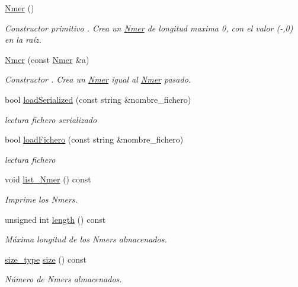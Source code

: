 \begin{DoxyCompactItemize}
\item 
\hyperlink{classNmer_ac2a651dd05b03e716b877c26386d772e}{Nmer} ()
\begin{DoxyCompactList}\small\item\em Constructor primitivo . Crea un \hyperlink{classNmer}{Nmer} de longitud maxima 0, con el valor (\textquotesingle{}-\/\textquotesingle{},0) en la raíz. \end{DoxyCompactList}\item 
\hyperlink{classNmer_aa15e62b748a55aec2f43f65497fc2a5e}{Nmer} (const \hyperlink{classNmer}{Nmer} \&a)
\begin{DoxyCompactList}\small\item\em Constructor . Crea un \hyperlink{classNmer}{Nmer} igual al \hyperlink{classNmer}{Nmer} pasado. \end{DoxyCompactList}\item 
bool \hyperlink{classNmer_a418c016bb6e04d2f699ddb694ee0221f}{load\+Serialized} (const string \&nombre\+\_\+fichero)
\begin{DoxyCompactList}\small\item\em lectura fichero serializado \end{DoxyCompactList}\item 
bool \hyperlink{classNmer_a4ef0e6b62a47a0bcd977aa3343602a17}{load\+Fichero} (const string \&nombre\+\_\+fichero)
\begin{DoxyCompactList}\small\item\em lectura fichero \end{DoxyCompactList}\item 
void \hyperlink{classNmer_a1ce1c0cb174d94685c7234f58f9dc119}{list\+\_\+\+Nmer} () const 
\begin{DoxyCompactList}\small\item\em Imprime los Nmers. \end{DoxyCompactList}\item 
unsigned int \hyperlink{classNmer_a60e2335600c01ee39e865790015818f0}{length} () const 
\begin{DoxyCompactList}\small\item\em Máxima longitud de los Nmers almacenados. \end{DoxyCompactList}\item 
\hyperlink{classNmer_a1b8892df885de3ac91edf3abd8f1b55d}{size\+\_\+type} \hyperlink{classNmer_accdea65838fcd53c48a2d05f6809643f}{size} () const 
\begin{DoxyCompactList}\small\item\em Número de Nmers almacenados. \end{DoxyCompactList}\item 

\end{DoxyCompactItemize}
